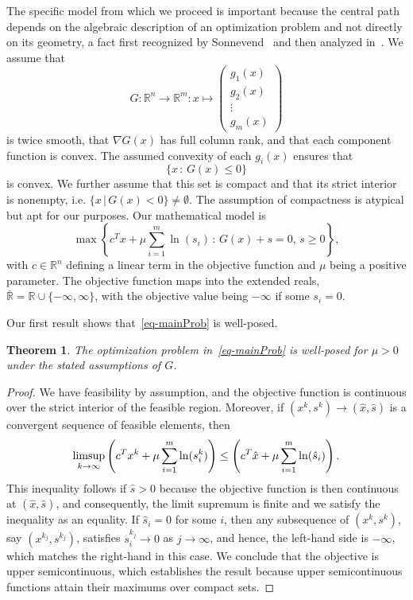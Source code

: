 \documentclass{article}
\newtheorem{theorem}{Theorem}
\def\mR{{\mathbb R}}
\def\xh{\hat{x}}
\def\sh{\hat{s}}
\begin{document}
The specific model from which we proceed is important because the
central path depends on the algebraic description of an optimization
problem and not directly on its geometry, a fact first recognized by 
Sonnevend~\cite{sonnevend86} and then analyzed in~\cite{caron02}. 
We assume that
\[
G:\mR^n \rightarrow \mR^m: 
    x \mapsto \left( \begin{array}{c} g_1(x) \\ g_2(x) \\ \vdots \\ g_m(x)
        \end{array} \right)
\]
is twice smooth, that $\nabla G(x)$ has full column rank, and that 
each component function is convex. The assumed convexity of each $g_i(x)$ 
ensures that 
\[
\{ x \, : \, G(x) \le 0 \}
\]
is convex. We further assume that this set is compact and that its strict 
interior is nonempty, i.e. $\{ x \, | \, G(x) < 0\} \neq \emptyset$. The 
assumption of compactness is atypical but apt for our purposes.
Our mathematical model is
\begin{equation} \label{eq-mainProb}
\max \left\{ c^T x + \mu \sum_{i=1}^m \ln (s_i) \, 
    : \, G(x) + s = 0, \, s \ge 0 \right\},
\end{equation}
with $c \in \mR^n$ defining a linear term in the objective function
and $\mu$ being a positive parameter. The objective function maps into
the extended reals, $\overline{\mR} = \mR \cup \{ -\infty, \infty\}$,
with the objective value being $-\infty$ if some $s_i = 0$.

Our first result shows that~\eqref{eq-mainProb} is well-posed.
\begin{theorem}
The optimization problem in~\eqref{eq-mainProb} is well-posed
for $\mu > 0$ under the stated assumptions of $G$.
\end{theorem}
\begin{proof}
We have feasibility by assumption, and the objective function
is continuous over the strict interior of the feasible region.
Moreover, if $(x^k, s^k) \rightarrow (\xh, \sh)$ is a convergent 
sequence of feasible elements, then
\[
\lim\!\sup_{\hspace*{-14pt}k \rightarrow \infty} 
    \left( c^T x^k + \mu \sum_{i=1}^m \ln (s^k_i) \right)
    \le \left( c^T \xh + \mu \sum_{i=1}^m \ln (\sh_i) \right).
\]
This inequality follows if $\sh > 0$ because the objective function 
is then continuous at $(\xh, \sh)$, and consequently, the limit 
supremum is finite and we satisfy the inequality as an equality. 
If $\sh_i = 0$ for some $i$, then any subsequence of $(x^k, s^k)$, 
say $(x^{k_j}, s^{k_j})$, satisfies $s_i^{k_j} \rightarrow 0$ as 
$j \rightarrow \infty$, and hence, the left-hand side is $-\infty$, 
which matches the right-hand in this case. We conclude that the 
objective is upper semicontinuous, which establishes the result 
because upper semicontinuous functions attain their maximums over 
compact sets.
\end{proof}
\end{document}
